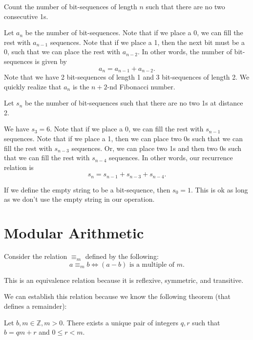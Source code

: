 \documentclass[a4paper]{article}
\begin{document}
\begin{eg}
	Count the number of bit-sequences of length \( n \) such that there are no two consecutive 1s.
\end{eg}

Let \( a_n \) be the number of bit-sequences. Note that if we place a 0, we can fill the rest with \( a_{n-1} \) sequences. Note that if we place a 1, then the next bit must be a 0, such that we can place the rest with \( a_{n-2} \). In other words, the number of bit-sequences is given by \[
	a_n = a_{n-1} + a_{n-2}
.\] Note that we have 2 bit-sequences of length 1 and 3 bit-sequences of length 2. We quickly realize that \( a_n \) is the \( n+2 \)-nd Fibonacci number.

\begin{eg}
	Let \( s_n \) be the number of bit-sequences such that there are no two 1s at distance 2.
\end{eg}

We have \( s_3=6 \). Note that if we place a 0, we can fill the rest with \( s_{n-1} \) sequences. Note that if we place a 1, then we can place two 0s such that we can fill the rest with \( s_{n-3} \) sequences. Or, we can place two 1s and then two 0s such that we can fill the rest with \( s_{n-4} \) sequences. In other words, our recurrence relation is \[
	s_n = s_{n-1} + s_{n-3} + s_{n-4}
.\] 

\begin{note}
	If we define the empty string to be a bit-sequence, then \( s_0=1 \). This is ok as long as we don't use the empty string in our operation.
\end{note}


\section{Modular Arithmetic}

Consider the relation \( \equiv_m \) defined by the following: \[
	a \equiv_m b \iff (a - b) \text{ is a multiple of } m
.\] 

\begin{note}
	This is an equivalence relation because it is reflexive, symmetric, and transitive.
\end{note}

We can establish this relation because we know the following theorem (that defines a remainder):

\begin{theorem}
	Let \( b,m \in \mathbb{Z},m>0 \). There exists a unique pair of integers \( q,r \) such that \( b = qm + r \) and \( 0 \le r < m \).
\end{theorem}
\end{document}
